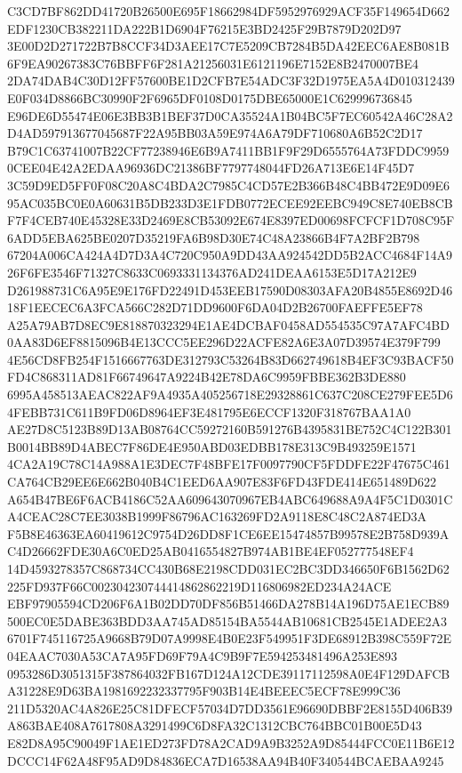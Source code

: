 \documentclass[UTF8,fontset=fandol,zihao=-4,a4paper]{ctexart}
\begin{document}
{{C3CD7BF862DD41720B26500E695F18662984DF5952976929ACF35F149654D662EDF1230CB382211DA222B1D6904F76215E3BD2425F29B7879D202D97
3E00D2D271722B7B8CCF34D3AEE17C7E5209CB7284B5DA42EEC6AE8B081B6F9EA90267383C76BBFF6F281A21256031E6121196E7152E8B2470007BE4
2DA74DAB4C30D12FF57600BE1D2CFB7E54ADC3F32D1975EA5A4D010312439E0F034D8866BC30990F2F6965DF0108D0175DBE65000E1C629996736845
E96DE6D55474E06E3BB3B1BEF37D0CA35524A1B04BC5F7EC60542A46C28A2D4AD597913677045687F22A95BB03A59E974A6A79DF710680A6B52C2D17
B79C1C63741007B22CF77238946E6B9A7411BB1F9F29D6555764A73FDDC99590CEE04E42A2EDAA96936DC21386BF7797748044FD26A713E6E14F45D7
3C59D9ED5FF0F08C20A8C4BDA2C7985C4CD57E2B366B48C4BB472E9D09E695AC035BC0E0A60631B5DB233D3E1FDB0772ECEE92EEBC949C8E740EB8CB
F7F4CEB740E45328E33D2469E8CB53092E674E8397ED00698FCFCF1D708C95F6ADD5EBA625BE0207D35219FA6B98D30E74C48A23866B4F7A2BF2B798
67204A006CA424A4D7D3A4C720C950A9DD43AA924542DD5B2ACC4684F14A926F6FE3546F71327C8633C0693331134376AD241DEAA6153E5D17A212E9
D261988731C6A95E9E176FD22491D453EEB17590D08303AFA20B4855E8692D4618F1EECEC6A3FCA566C282D71DD9600F6DA04D2B26700FAEFFE5EF78
A25A79AB7D8EC9E818870323294E1AE4DCBAF0458AD554535C97A7AFC4BD0AA83D6EF8815096B4E13CCC5EE296D22ACFE82A6E3A07D39574E379F799
4E56CD8FB254F1516667763DE312793C53264B83D662749618B4EF3C93BACF50FD4C868311AD81F66749647A9224B42E78DA6C9959FBBE362B3DE880
6995A458513AEAC822AF9A4935A405256718E29328861C637C208CE279FEE5D64FEBB731C611B9FD06D8964EF3E481795E6ECCF1320F318767BAA1A0
AE27D8C5123B89D13AB08764CC59272160B591276B4395831BE752C4C122B301B0014BB89D4ABEC7F86DE4E950ABD03EDBB178E313C9B493259E1571
4CA2A19C78C14A988A1E3DEC7F48BFE17F0097790CF5FDDFE22F47675C461CA764CB29EE6E662B040B4C1EED6AA907E83F6FD43FDE414E651489D622
A654B47BE6F6ACB4186C52AA609643070967EB4ABC649688A9A4F5C1D0301CA4CEAC28C7EE3038B1999F86796AC163269FD2A9118E8C48C2A874ED3A
F5B8E46363EA60419612C9754D26DD8F1CE6EE15474857B99578E2B758D939AC4D26662FDE30A6C0ED25AB0416554827B974AB1BE4EF052777548EF4
14D4593278357C868734CC430B68E2198CDD031EC2BC3DD346650F6B1562D62225FD937F66C002304230744414862862219D116806982ED234A24ACE
EBF97905594CD206F6A1B02DD70DF856B51466DA278B14A196D75AE1ECB89500EC0E5DABE363BDD3AA745AD85154BA5544AB10681CB2545E1ADEE2A3
6701F745116725A9668B79D07A9998E4B0E23F549951F3DE68912B398C559F72E04EAAC7030A53CA7A95FD69F79A4C9B9F7E594253481496A253E893
0953286D3051315F387864032FB167D124A12CDE39117112598A0E4F129DAFCBA31228E9D63BA1981692232337795F903B14E4BEEEC5ECF78E999C36
211D5320AC4A826E25C81DFECF57034D7DD3561E96690DBBF2E8155D406B39A863BAE408A7617808A3291499C6D8FA32C1312CBC764BBC01B00E5D43
E82D8A95C90049F1AE1ED273FD78A2CAD9A9B3252A9D85444FCC0E11B6E12DCCC14F62A48F95AD9D84836ECA7D16538AA94B40F340544BCAEBAA9245
}}
\end{document}
